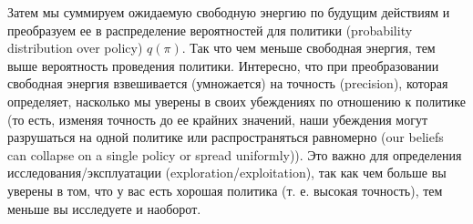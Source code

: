 \documentclass[12pt]{article}
\begin{document}
Затем мы суммируем ожидаемую свободную энергию по будущим действиям и преобразуем ее в распределение вероятностей для политики (probability distribution over policy) $q(\pi)$. Так что чем меньше свободная энергия, тем выше вероятность проведения политики. Интересно, что при преобразовании свободная энергия взвешивается (умножается) на точность (precision), которая определяет, насколько мы уверены в своих убеждениях по отношению к политике (то есть, изменяя точность до ее крайних значений, наши убеждения могут разрушаться на одной политике или распространяться равномерно (our beliefs can collapse on a single policy or spread uniformly)). Это важно для определения исследования/эксплуатации (exploration/exploitation), так как чем больше вы уверены в том, что у вас есть хорошая политика (т. е. высокая точность), тем меньше вы исследуете и наоборот.

\begin{figure}[h]
\end{figure}

\end{document}
